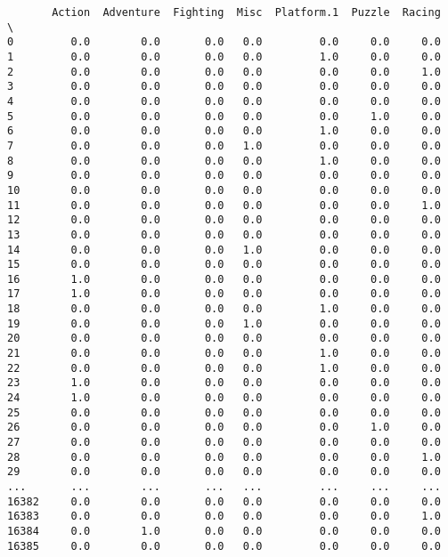 \documentclass[11pt]{article}
\begin{document}
    
    \begin{verbatim}
       Action  Adventure  Fighting  Misc  Platform.1  Puzzle  Racing  \
0         0.0        0.0       0.0   0.0         0.0     0.0     0.0   
1         0.0        0.0       0.0   0.0         1.0     0.0     0.0   
2         0.0        0.0       0.0   0.0         0.0     0.0     1.0   
3         0.0        0.0       0.0   0.0         0.0     0.0     0.0   
4         0.0        0.0       0.0   0.0         0.0     0.0     0.0   
5         0.0        0.0       0.0   0.0         0.0     1.0     0.0   
6         0.0        0.0       0.0   0.0         1.0     0.0     0.0   
7         0.0        0.0       0.0   1.0         0.0     0.0     0.0   
8         0.0        0.0       0.0   0.0         1.0     0.0     0.0   
9         0.0        0.0       0.0   0.0         0.0     0.0     0.0   
10        0.0        0.0       0.0   0.0         0.0     0.0     0.0   
11        0.0        0.0       0.0   0.0         0.0     0.0     1.0   
12        0.0        0.0       0.0   0.0         0.0     0.0     0.0   
13        0.0        0.0       0.0   0.0         0.0     0.0     0.0   
14        0.0        0.0       0.0   1.0         0.0     0.0     0.0   
15        0.0        0.0       0.0   0.0         0.0     0.0     0.0   
16        1.0        0.0       0.0   0.0         0.0     0.0     0.0   
17        1.0        0.0       0.0   0.0         0.0     0.0     0.0   
18        0.0        0.0       0.0   0.0         1.0     0.0     0.0   
19        0.0        0.0       0.0   1.0         0.0     0.0     0.0   
20        0.0        0.0       0.0   0.0         0.0     0.0     0.0   
21        0.0        0.0       0.0   0.0         1.0     0.0     0.0   
22        0.0        0.0       0.0   0.0         1.0     0.0     0.0   
23        1.0        0.0       0.0   0.0         0.0     0.0     0.0   
24        1.0        0.0       0.0   0.0         0.0     0.0     0.0   
25        0.0        0.0       0.0   0.0         0.0     0.0     0.0   
26        0.0        0.0       0.0   0.0         0.0     1.0     0.0   
27        0.0        0.0       0.0   0.0         0.0     0.0     0.0   
28        0.0        0.0       0.0   0.0         0.0     0.0     1.0   
29        0.0        0.0       0.0   0.0         0.0     0.0     0.0   
...       ...        ...       ...   ...         ...     ...     ...   
16382     0.0        0.0       0.0   0.0         0.0     0.0     0.0   
16383     0.0        0.0       0.0   0.0         0.0     0.0     1.0   
16384     0.0        1.0       0.0   0.0         0.0     0.0     0.0   
16385     0.0        0.0       0.0   0.0         0.0     0.0     0.0   

\end{verbatim}
\end{document}
